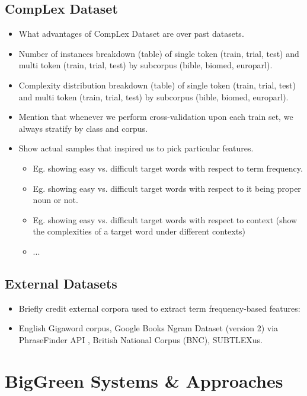 \documentclass[11pt,a4paper]{article}
\begin{document}
\subsection{CompLex Dataset}

\begin{itemize}
  \item What advantages of CompLex Dataset are over past datasets.
  \item Number of instances breakdown (table) of single token (train, trial, test) and multi token (train, trial, test) by subcorpus (bible, biomed, europarl).
  \item Complexity distribution breakdown (table) of single token (train, trial, test) and multi token (train, trial, test) by subcorpus (bible, biomed, europarl).
  \item Mention that whenever we perform cross-validation upon each train set, we always stratify by class and corpus.
  \item Show actual samples that inspired us to pick particular features. 
  \begin{itemize}
    \item Eg. showing easy vs. difficult target words with respect to term frequency.
    \item Eg. showing easy vs. difficult target words with respect to it being proper noun or not.
    \item Eg. showing easy vs. difficult target words with respect to context (show the complexities of a target word under different contexts)
    \item ...
  \end{itemize}
\end{itemize}

\subsection{External Datasets}

\begin{itemize}
  \item Briefly credit external corpora used to extract term frequency-based features:
  \item English Gigaword corpus, Google Books Ngram Dataset (version 2) via PhraseFinder API \citep{phrasefinder}, British National Corpus (BNC), SUBTLEXus.
\end{itemize}

\section{BigGreen Systems \& Approaches}
\end{document}

